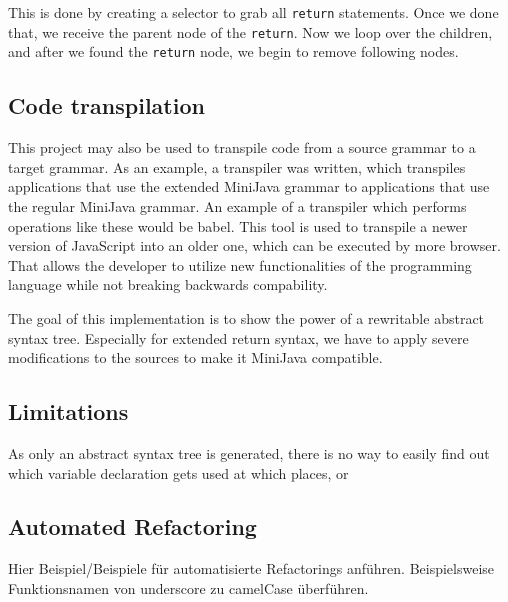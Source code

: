 This is done by creating a selector to grab all \verb|return| statements. Once we done that, we receive the parent node of the \verb|return|. Now we loop over the children, and after we found the \verb|return| node, we begin to remove following nodes.

\subsection{Code transpilation}

This project may also be used to transpile code from a source grammar to a target grammar. As an example, a transpiler was written, which transpiles applications that use
the extended MiniJava grammar to applications that use the regular MiniJava grammar. An example of a transpiler which performs operations like these would be babel. This tool is
used to transpile a newer version of JavaScript into an older one, which can be executed by more browser. That allows the developer to utilize new functionalities of the programming language while not breaking backwards compability.

The goal of this implementation is to show the power of a rewritable abstract syntax tree. Especially for extended return syntax, we have to apply severe modifications to the sources
to make it MiniJava compatible.

\subsection{Limitations}

As only an abstract syntax tree is generated, there is no way to easily find out which variable declaration gets used at which places, or 

\subsection{Automated Refactoring}

Hier Beispiel/Beispiele für automatisierte Refactorings anführen. Beispielsweise Funktionsnamen von underscore zu camelCase überführen.